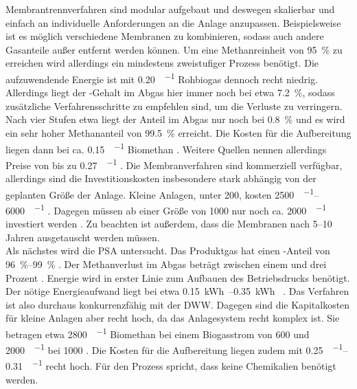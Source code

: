 Membrantrennverfahren sind modular aufgebaut und deswegen skalierbar und einfach an individuelle Anforderungen an die Anlage anzupassen. Beispielsweise ist es möglich verschiedene Membranen zu kombinieren, sodass auch andere Gasanteile außer  entfernt werden können. Um eine Methanreinheit von \SI{95}{\percent} zu erreichen wird allerdings ein mindestens zweistufiger Prozess benötigt. Die aufzuwendende Energie ist mit \SI{0,20}{\kwh\per\normvol} Rohbiogas dennoch recht niedrig. Allerdings liegt der -Gehalt im Abgas hier immer noch bei etwa \SI{7,2}{\percent}, sodass zusätzliche Verfahrensschritte zu empfehlen sind, um die Verluste zu verringern. Nach vier Stufen etwa liegt der Anteil im Abgas nur noch bei \SI{0,8}{\percent} und es wird ein sehr hoher Methananteil von \SI{99,5}{\percent} erreicht. Die Kosten für die Aufbereitung liegen dann bei ca. \SI{0,15}{\sieuro\per\normvol} Biomethan \parencite{Miltner2016}. Weitere Quellen nennen allerdings Preise von bis zu \SI{0,27}{\sieuro\per\normvol} \parencite{Emp18}. Die Membranverfahren sind kommerziell verfügbar, allerdings sind die Investitionskosten insbesondere stark abhängig von der geplanten Größe der Anlage. Kleine Anlagen, unter \SI{200}{\normvolh}, kosten \SIrange{2500}{6000}{\sieuro\per\normvolh} \parencite{BHPT13}. Dagegen müssen ab einer Größe von \SI{1000}{\normvolh} nur noch ca. \SI{2000}{\sieuro\per\normvolh} investiert werden \parencite{BHPT13}. Zu beachten ist außerdem, dass die Membranen nach \SIrange{5}{10}{\relax} Jahren ausgetauscht werden müssen. \parencite{Miltner2016} \parencite{KGKK2019} \\

Als nächstes wird die \gls{PSA} untersucht. Das Produktgas hat einen -Anteil von \SIrange{96}{99}{\percent} \parencite{DSW13} \parencite{KGKK2019}. Der Methanverlust im Abgas beträgt zwischen einem und drei Prozent \parencite{KGKK2019} \parencite{dena2019}. 
Energie wird in erster Linie zum Aufbauen des Betriebsdrucks benötigt. Der nötige Energieaufwand liegt bei etwa \SIrange{0,15}{0,35}{\kWh\normvol} \parencite{Coll17}. Das Verfahren ist also durchaus konkurrenzfähig mit der \gls{DWW}. Dagegen sind die Kapitalkosten für kleine Anlagen aber recht hoch, da das Anlagesystem recht komplex ist. Sie betragen etwa \SI{2800}{\sieuro\per\normvolh} Biomethan bei einem Biogasstrom von \SI{600}{\normvolh} und \SI{2000}{\sieuro\per\normvolh} bei \SI{1000}{\normvolh} \parencite{BHPT13}.
Die Kosten für die Aufbereitung liegen zudem mit \SIrange{0,25}{0,31}{\sieuro\per\normvol} recht hoch.
Für den Prozess spricht, dass keine Chemikalien benötigt werden. \parencite{AONC2019} \\

